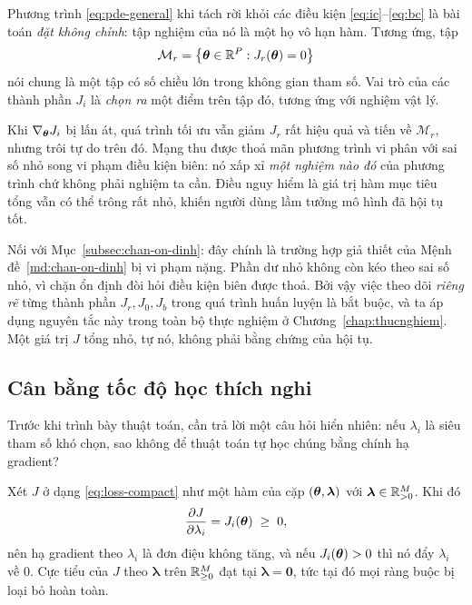 \begin{nhanxet}
\label{rem:ill-posedness}
Phương trình \eqref{eq:pde-general} khi tách rời khỏi các điều kiện
\eqref{eq:ic}--\eqref{eq:bc} là bài toán \emph{đặt không chỉnh}: tập nghiệm của
nó là một họ vô hạn hàm. Tương ứng, tập
\begin{equation}
\mathcal{M}_{r}
 = \left\{ \bm{\theta} \in \mathbb{R}^{P} : J_{r}(\bm{\theta}) = 0 \right\}
\label{eq:manifold-r}
\end{equation}
nói chung là một tập có số chiều lớn trong không gian tham số. Vai trò của các
thành phần $J_{i}$ là \emph{chọn ra} một điểm trên tập đó, tương ứng với nghiệm
vật lý.
 
Khi $\nabla_{\bm{\theta}} J_{i}$ bị lấn át, quá trình tối ưu vẫn giảm $J_{r}$ rất
hiệu quả và tiến về $\mathcal{M}_{r}$, nhưng trôi tự do trên đó. Mạng thu được
thoả mãn phương trình vi phân với sai số nhỏ song vi phạm điều kiện biên: nó xấp
xỉ \emph{một nghiệm nào đó} của phương trình chứ không phải nghiệm ta cần. Điều
nguy hiểm là giá trị hàm mục tiêu tổng vẫn có thể trông rất nhỏ, khiến người dùng
lầm tưởng mô hình đã hội tụ tốt.
 
Nối với Mục~\ref{subsec:chan-on-dinh}: đây chính là trường hợp giả thiết của
Mệnh đề~\ref{md:chan-on-dinh} bị vi phạm nặng. Phần dư nhỏ không còn kéo theo sai
số nhỏ, vì chặn ổn định đòi hỏi điều kiện biên được thoả. Bởi vậy việc theo dõi
\emph{riêng rẽ} từng thành phần $J_{r}, J_{0}, J_{b}$ trong quá trình huấn luyện
là bắt buộc, và ta áp dụng nguyên tắc này trong toàn bộ thực nghiệm ở
Chương~\ref{chap:thucnghiem}. Một giá trị $J$ tổng nhỏ, tự nó, không phải bằng
chứng của hội tụ.
\end{nhanxet}
 
\subsection{Cân bằng tốc độ học thích nghi}
\label{subsec:annealing}
 
Trước khi trình bày thuật toán, cần trả lời một câu hỏi hiển nhiên: nếu
$\lambda_i$ là siêu tham số khó chọn, sao không để thuật toán tự học chúng bằng
chính hạ gradient?
 
\begin{bode}
\label{bd:lambda-tam-thuong}
Xét $J$ ở dạng \eqref{eq:loss-compact} như một hàm của cặp
$(\bm{\theta}, \bm{\lambda})$ với $\bm{\lambda} \in \mathbb{R}^{M}_{>0}$. Khi đó
\begin{equation}
\frac{\partial J}{\partial \lambda_{i}} = J_{i}(\bm{\theta}) \;\ge\; 0 ,
\label{eq:dJ-dlambda}
\end{equation}
nên hạ gradient theo $\lambda_i$ là đơn điệu không tăng, và nếu
$J_i(\bm{\theta}) > 0$ thì nó đẩy $\lambda_{i}$ về $0$. Cực tiểu của $J$ theo
$\bm{\lambda}$ trên $\mathbb{R}^M_{\ge 0}$ đạt tại $\bm{\lambda} = \bm{0}$, tức tại đó
mọi ràng buộc bị loại bỏ hoàn toàn.
\end{bode}
 

